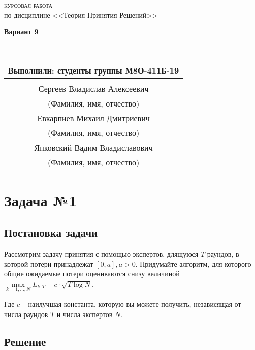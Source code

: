\documentclass[a4paper,14pt]{extarticle}
\begin{document}
\begin{center}
{	
	\vfill \textsc{\Large курсовая работа} \\
	{\large по дисциплине <<Теория Принятия Решений>>}
 
        \bigskip
        
        \textbf{Вариант 9}
 }
\end{center}
\vspace*{1.5cm}

\hfill 
\begin{minipage}{.6\linewidth}\
\begin{tabular}{c}

\textbf{Выполнили:} студенты группы М8О-411Б-19 \\\hline \\[.3cm]
{\large Сергеев Владислав Алексеевич} \\ \hline \scriptsize{(Фамилия, имя, отчество)}
\\[.3cm]
{\large Евкарпиев Михаил Дмитриевич} \\ \hline \scriptsize{(Фамилия, имя, отчество)}
\\[.3cm]
{\large Янковский Вадим Владиславович} \\ \hline \scriptsize{(Фамилия, имя, отчество)}
\\[.3cm]

\end{tabular}
\vspace*{1cm}
\end{minipage}		

\vspace*{1cm}

\newpage

\section{Задача №1}
\subsection{Постановка задачи}

Рассмотрим задачу принятия с помощью экспертов, длящуюся $T$ раундов, в которой потери принадлежат $[0, a], a > 0$. Придумайте алгоритм, для которого общие ожидаемые потери 
оцениваются снизу величиной $\max\limits_{k=1,\dots,N} L_{k,T}-c\cdot\sqrt{T\log N}$.

Где $c$ – наилучшая константа, которую вы можете получить, независящая от числа раундов $T$ и
числа экспертов $N$.

\subsection{Решение}
\end{document}
